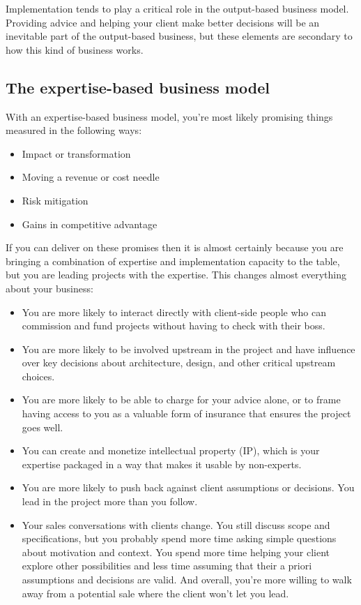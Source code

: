 Implementation tends to play a critical role in the output-based business model. Providing advice and helping your client make better decisions will be an inevitable part of the output-based business, but these elements are secondary to how this kind of business works.

\subsection{The expertise-based business model}

With an expertise-based business model, you're most likely promising things measured in the following ways:

\begin{itemize}
\item Impact or transformation
\item Moving a revenue or cost needle
\item Risk mitigation
\item Gains in competitive advantage
\end{itemize}

If you can deliver on these promises then it is almost certainly because you are bringing a combination of expertise and implementation capacity to the table, but you are leading projects with the expertise. This changes almost everything about your business:

\begin{itemize}
\item You are more likely to interact directly with client-side people who can commission and fund projects without having to check with their boss.
\item You are more likely to be involved upstream in the project and have influence over key decisions about architecture, design, and other critical upstream choices.
\item You are more likely to be able to charge for your advice alone, or to frame having access to you as a valuable form of insurance that ensures the project goes well.
\item You can create and monetize intellectual property (IP), which is your expertise packaged in a way that makes it usable by non-experts.
\item You are more likely to push back against client assumptions or decisions. You lead in the project more than you follow.
\item Your sales conversations with clients change. You still discuss scope and specifications, but you probably spend more time asking simple questions about motivation and context. You spend more time helping your client explore other possibilities and less time assuming that their a priori assumptions and decisions are valid. And overall, you're more willing to walk away from a potential sale where the client won't let you lead.
\end{itemize}

